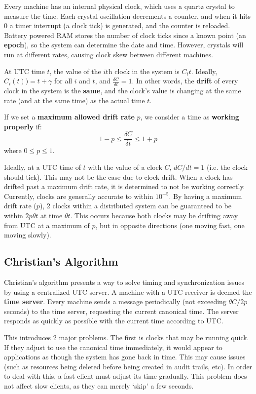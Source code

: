 \documentclass{article}
\begin{document}
Every machine has an internal physical clock, which uses a quartz crystal to measure the time. Each crystal oscillation decrements a counter, and when it hits 0 a timer interrupt (a clock tick) is generated, and the counter is reloaded. Battery powered RAM stores the number of clock ticks since a known point (an \textbf{epoch}), so the system can determine the date and time. However, crystals will run at different rates, causing clock skew between different machines.

At UTC time $t$, the value of the $i$th clock in the system is $C_i{t}$. Ideally, $C_i(t)) = t + \gamma$ for all $i$ and $t$, and $\frac{\delta C}{\delta t} = 1$. In other words, the \textbf{drift} of every clock in the system is the \textbf{same}, and the clock's value is changing at the same rate (and at the same time) as the actual time $t$.

If we set a \textbf{maximum allowed drift rate} $p$, we consider a time as \textbf{working properly} if:
\begin{equation}
	1 - p \leq \frac{\delta C}{\delta t} \leq 1 + p
\end{equation}
where $0 \leq p \leq 1$.

Ideally, at a UTC time of $t$ with the value of a clock $C$, $dC/dt=1$ (i.e. the clock should tick). This may not be the case due to clock drift. When a clock has drifted past a maximum drift rate, it is determined to not be working correctly. Currently, clocks are generally accurate to within $10^{-5}$. By having a maximum drift rate ($p$), 2 clocks within a distributed system can be guaranteed to be within $2p \theta t$ at time $\theta t$. This occurs because both clocks may be drifting away from UTC at a maximum of $p$, but in opposite directions (one moving fast, one moving slowly).

\subsection{Christian's Algorithm}
Christian's algorithm presents a way to solve timing and synchronization issues by using a centralized UTC server. A machine with a UTC receiver is deemed the \textbf{time server}. Every machine sends a message periodically (not exceeding $\theta C / 2p$ seconds) to the time server, requesting the current canonical time. The server responds as quickly as possible with the current time according to UTC. 

This introduces 2 major problems. The first is clocks that may be running quick. If they adjust to use the canonical time immediately, it would appear to applications as though the system has gone back in time. This may cause issues (such as resources being deleted before being created in audit trails, etc). In order to deal with this, a fast client must adjust its time gradually. This problem does not affect slow clients, as they can merely `skip' a few seconds. 
\end{document}

